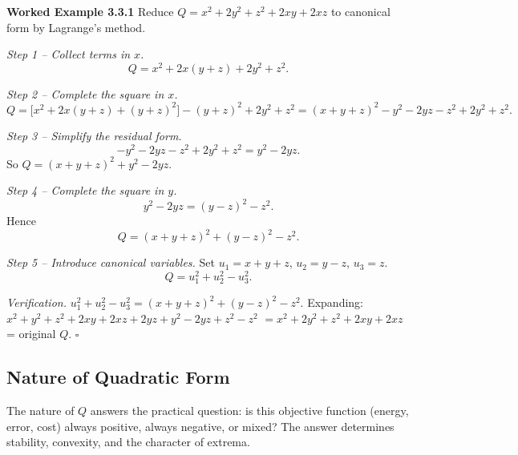 \documentclass[12pt,a4paper]{article}
\begin{document}
\textbf{Worked Example 3.3.1} Reduce $Q = x^{2} + 2y^{2} + z^{2} + 2xy + 2xz$ to canonical form by Lagrange's method.

\textit{Step 1 -- Collect terms in $x$.}
\[
Q = x^{2} + 2x(y+z) + 2y^{2} + z^{2}.
\]

\textit{Step 2 -- Complete the square in $x$.}
\[
Q = \bigl[x^{2} + 2x(y+z) + (y+z)^{2}\bigr] - (y+z)^{2} + 2y^{2} + z^{2}
  = (x+y+z)^{2} - y^{2} - 2yz - z^{2} + 2y^{2} + z^{2}.
\]

\textit{Step 3 -- Simplify the residual form.}
\[
-y^{2}-2yz-z^{2}+2y^{2}+z^{2} = y^{2}-2yz.
\]
So $Q = (x+y+z)^{2} + y^{2} - 2yz$.

\textit{Step 4 -- Complete the square in $y$.}
\[
y^{2} - 2yz = (y-z)^{2} - z^{2}.
\]
Hence
\[
Q = (x+y+z)^{2} + (y-z)^{2} - z^{2}.
\]

\textit{Step 5 -- Introduce canonical variables.}
Set $u_1 = x+y+z$, $u_2 = y-z$, $u_3 = z$.
\[
\boxed{Q = u_1^{2} + u_2^{2} - u_3^{2}.}
\]

\textit{Verification.} $u_1^{2}+u_2^{2}-u_3^{2} = (x+y+z)^{2}+(y-z)^{2}-z^{2}$.
Expanding: $x^{2}+y^{2}+z^{2}+2xy+2xz+2yz + y^{2}-2yz+z^{2} - z^{2}$
$= x^{2}+2y^{2}+z^{2}+2xy+2xz$ = original $Q$. \checkmark \hfill$\square$

\subsection{Nature of Quadratic Form}

The nature of $Q$ answers the practical question: is this objective function (energy, error, cost) always positive, always negative, or mixed? The answer determines stability, convexity, and the character of extrema.
\end{document}
